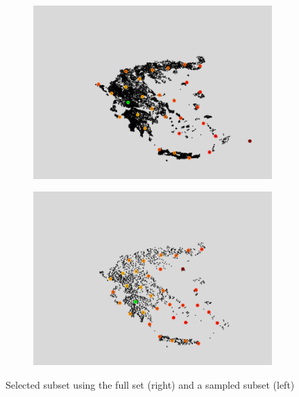 \begin{figure}[H] 
  \begin{subfigure}[b]{0.5\linewidth}
    \centering
    \includegraphics[width=0.9\linewidth]{Pictures/ls_greece} 
    \label{fig:ls_greece} 
    \vspace{4ex}
  \end{subfigure}%
  \begin{subfigure}[b]{0.5\linewidth}
    \centering
    \includegraphics[width=0.9\linewidth]{Pictures/rs_greece} 
    \label{fig:rs_greece} 
    \vspace{4ex}
  \end{subfigure}
  \caption{Selected subset using the full set (right) and a sampled subset (left)}
  \label{fig:ls_rs_greece} 
\end{figure}

